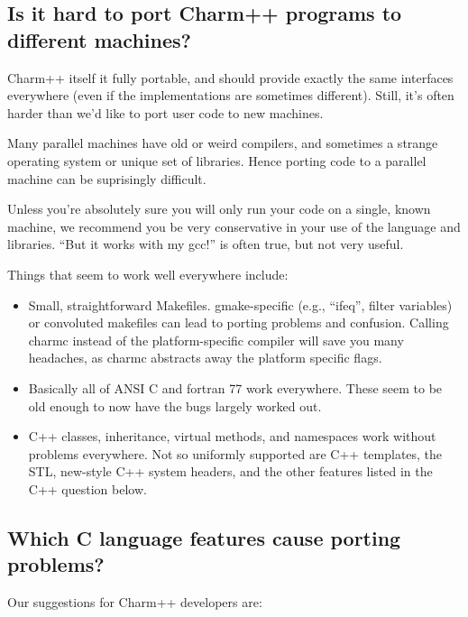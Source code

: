 \subsection{Is it hard to port Charm++ programs to different machines?}

\label{porting}
Charm++ itself it fully portable, and should provide exactly 
the same interfaces everywhere (even if the implementations are 
sometimes different).  Still, it's often harder than we'd like
to port user code to new machines.

Many parallel machines have old or weird compilers, and 
sometimes a strange operating system or unique set of libraries.  
Hence porting code to a parallel machine can be suprisingly difficult.

Unless you're absolutely sure you will only run your code on a
single, known machine, we recommend you be very conservative in 
your use of the language and libraries.  ``But it works with my gcc!''
is often true, but not very useful.

Things that seem to work well everywhere include:
\begin{itemize}
\item Small, straightforward Makefiles.  gmake-specific (e.g.,
``ifeq'', filter variables) or convoluted makefiles can lead 
to porting problems and confusion.  Calling charmc instead
of the platform-specific compiler will save you many headaches,
as charmc abstracts away the platform specific flags.
\item Basically all of ANSI C and fortran 77 work everywhere.  These seem 
to be old enough to now have the bugs largely worked out.
\item C++ classes, inheritance, virtual methods, and namespaces
work without problems everywhere.  Not so uniformly supported 
are C++ templates, the STL, new-style C++ system headers, 
and the other features listed in the C++ question below.
\end{itemize}

\subsection{Which C language features cause porting problems?}

Our suggestions for Charm++ developers are:

